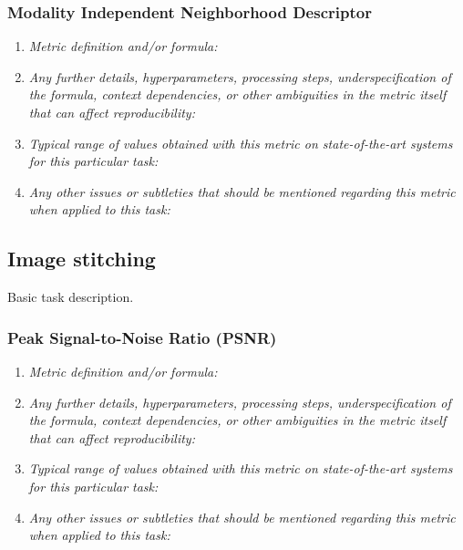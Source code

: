\documentclass[a4paper,11pt]{article}
\begin{document}
        \subsubsection{Modality Independent Neighborhood Descriptor}
            \begin{enumerate}[label=\alph*.]
                \item \textit{Metric definition and/or formula:}
                \bigskip
                \item \textit{Any further details, hyperparameters, processing steps, underspecification of the formula, context dependencies, or other ambiguities in the metric itself that can affect reproducibility:}
                \bigskip
                \item \textit{Typical range of values obtained with this metric on state-of-the-art systems for this particular task:}
                \bigskip
                \item \textit{Any other issues or subtleties that should be mentioned regarding this metric when applied to this task:}
                \bigskip
            \end{enumerate}

    \subsection{Image stitching}
        Basic task description.
        \subsubsection{Peak Signal-to-Noise Ratio (PSNR)}
            \begin{enumerate}[label=\alph*.]
                \item \textit{Metric definition and/or formula:}
                \bigskip
                \item \textit{Any further details, hyperparameters, processing steps, underspecification of the formula, context dependencies, or other ambiguities in the metric itself that can affect reproducibility:}
                \bigskip
                \item \textit{Typical range of values obtained with this metric on state-of-the-art systems for this particular task:}
                \bigskip
                \item \textit{Any other issues or subtleties that should be mentioned regarding this metric when applied to this task:}
                \bigskip
            \end{enumerate}
\end{document}
